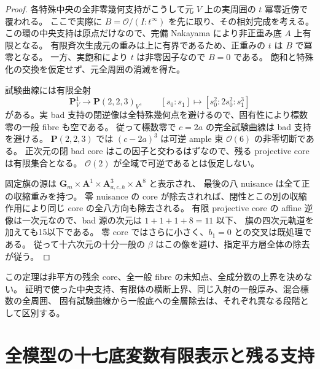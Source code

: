 \documentclass[11pt,a4paper]{ltjsarticle}
\newcommand{\PP}{\mathbf P}
\theoremstyle{remark}
\begin{document}
\begin{proof}
各特殊中央の全非零幾何支持がこうして元 $V$ 上の実周囲の $t$ 冪零近傍で覆われる。
ここで実際に $B=\mathcal O/(I:t^\infty)$ を先に取り、その相対完成を考える。
この環の中央支持は原点だけなので、完備 Nakayama により非正重み底 $A$ 上有限となる。
有限斉次生成元の重みは上に有界であるため、正重みの $t$ は $B$ で冪零となる。
一方、実飽和により $t$ は非零因子なので $B=0$ である。
飽和と特殊化の交換を仮定せず、元全周囲の消滅を得た。

試験曲線には有限全射
\[
 \PP^1_V\longrightarrow\PP(2,2,3)_V,
       \qquad [s_0:s_1]\longmapsto[s_0^2:2s_0^2:s_1^3]
\]
がある。実 bad 支持の閉逆像は全特殊幾何点を避けるので、固有性により標数零の一般 fibre も空である。
従って標数零で $c=2a$ の完全試験曲線は bad 支持を避ける。
$\PP(2,2,3)$ では $(c-2a)^3$ は可逆 ample 束 $\mathcal O(6)$ の非零切断である。
正次元の閉 bad core はこの因子と交わるはずなので、残る projective core は有限集合となる。
$\mathcal O(2)$ が全域で可逆であるとは仮定しない。

固定旗の源は $\mathbf G_m\times\mathbf A^1\times\mathbf A^3_{a,c,h}\times\mathbf A^8$ と表示され、
最後の八 nuisance は全て正の収縮重みを持つ。
零 nuisance の core が除去されれば、閉性とこの別の収縮作用により同じ core の全八方向も除去される。
有限 projective core の affine 逆像は一次元なので、bad 源の次元は $1+1+1+8=11$ 以下、
旗の四次元軌道を加えても15以下である。
零 core ではさらに小さく、$b_1=0$ との交叉は既処理である。
従って十六次元の十分一般の $\beta$ はこの像を避け、指定平方層全体の除去が従う。
\end{proof}

この定理は非平方の残余 core、全一般 fibre の未知点、全成分数の上界を決めない。
証明で使った中央支持、有限体の横断上界、同じ入射の一般厚み、混合標数の全周囲、
固有試験曲線から一般底への全層除去は、それぞれ異なる段階として区別する。

\section{全模型の十七底変数有限表示と残る支持}\label{sec:seventeen-base-v62}
\end{document}
